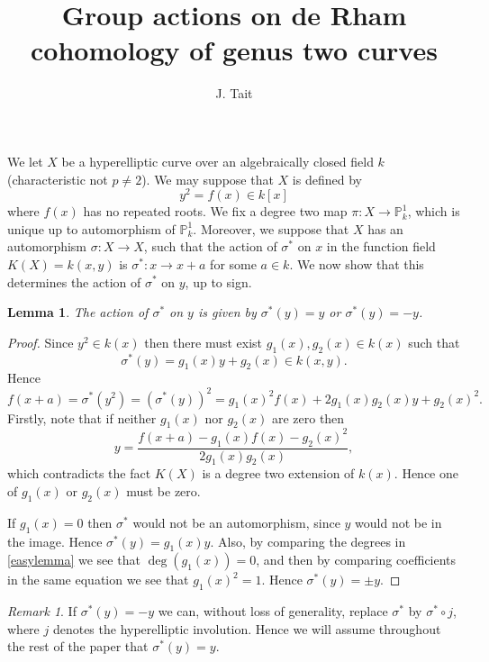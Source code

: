 \documentclass[draft, 11pt]{article} %
\title{Group actions on de Rham cohomology of genus two curves}
\author{J. Tait}
\theoremstyle{plain}
\newtheorem{lem}[defn]{Lemma}
\theoremstyle{remark}
\newtheorem*{rem}{Remark}
\newcommand{\ra}{\rightarrow}
\begin{document}
\maketitle
\listoftodos
\bigskip


We let $X$ be a hyperelliptic curve over an algebraically closed field $k$ (characteristic not $p \neq 2$).
We may suppose that $X$ is defined by 
\begin{equation}\label{definingequation}
y^2 = f(x) \in k[x]
\end{equation}
where $f(x)$ has no repeated roots.
We fix a degree two map $\pi \colon X \ra \mathbb P^1_k$, which is unique up to automorphism of $\mathbb P_k^1$.
Moreover, we suppose that $X$ has an automorphism $\sigma \colon X \ra X$, such that the action of $\sigma^*$ on $x$ in the function field $K(X) = k(x,y)$ is $\sigma^* \colon x \to x+a$ for some $a\in k$.
We now show that this determines the action of $\sigma^*$ on $y$, up to sign.


\begin{lem}
The action of $\sigma^*$ on $y$ is given by $\sigma^*(y) = y$ or $\sigma^*(y) = -y$.
\end{lem}
\begin{proof}
Since $y^2 \in k(x)$ then there must exist $g_1(x), g_2(x) \in k(x)$ such that 
\begin{equation*}
\sigma^*(y) = g_1(x)y + g_2(x) \in k(x,y).
\end{equation*}
Hence
\begin{equation}\label{easylemma}
f(x+a) = \sigma^*(y^2) = (\sigma^*(y))^2 = g_1(x)^2f(x)+2g_1(x)g_2(x)y + g_2(x)^2.
\end{equation}
Firstly, note that if neither $g_1(x)$ nor $g_2(x)$ are zero then
\[
y = \frac{f(x+a) - g_1(x)f(x) - g_2(x)^2}{2g_1(x)g_2(x)},
\]
which contradicts the fact $K(X)$ is a degree two extension of $k(x)$.
Hence one of $g_1(x)$ or $g_2(x)$ must be zero.

If $g_1(x) = 0$ then $\sigma^*$ would not be an automorphism, since $y$ would not be in the image.
Hence $\sigma^*(y) = g_1(x)y$.
Also, by comparing the degrees in \eqref{easylemma} we see that $\deg(g_1(x)) = 0$, and then by comparing coefficients in the same equation we see that $g_1(x)^2 = 1$.
Hence $\sigma^*(y) = \pm y$.
\end{proof}
\begin{rem}
If $\sigma^*(y) = -y$ we can, without loss of generality, replace $\sigma^*$ by $\sigma^* \circ j$, where $j$ denotes the hyperelliptic involution.
Hence we will assume throughout the rest of the paper that $\sigma^*(y) = y$.
\end{rem}
\end{document}
